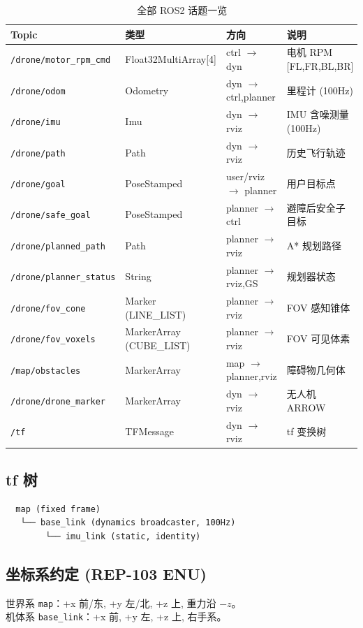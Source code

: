 \documentclass[12pt,a4paper]{article}
\newcommand{\ros}[1]{\texttt{#1}}
\begin{document}
\begin{table}[H]
\centering
\caption{全部 ROS2 话题一览}
\label{tab:topics}
\footnotesize
\begin{tabularx}{\textwidth}{l l l X}
\toprule
\textbf{Topic} & \textbf{类型} & \textbf{方向} & \textbf{说明} \\
\midrule
\ros{/drone/motor\_rpm\_cmd} & Float32MultiArray[4] & ctrl $\to$ dyn & 电机 RPM [FL,FR,BL,BR] \\
\ros{/drone/odom}        & Odometry     & dyn $\to$ ctrl,planner & 里程计 (100Hz) \\
\ros{/drone/imu}         & Imu          & dyn $\to$ rviz & IMU 含噪测量 (100Hz) \\
\ros{/drone/path}        & Path         & dyn $\to$ rviz & 历史飞行轨迹 \\
\ros{/drone/goal}        & PoseStamped & user/rviz $\to$ planner & 用户目标点 \\
\ros{/drone/safe\_goal}   & PoseStamped & planner $\to$ ctrl & 避障后安全子目标 \\
\ros{/drone/planned\_path} & Path        & planner $\to$ rviz & A* 规划路径 \\
\ros{/drone/planner\_status} & String    & planner $\to$ rviz,GS & 规划器状态 \\
\ros{/drone/fov\_cone}    & Marker (LINE\_LIST) & planner $\to$ rviz & FOV 感知锥体 \\
\ros{/drone/fov\_voxels}  & MarkerArray (CUBE\_LIST) & planner $\to$ rviz & FOV 可见体素 \\
\ros{/map/obstacles}     & MarkerArray & map $\to$ planner,rviz & 障碍物几何体 \\
\ros{/drone/drone\_marker} & MarkerArray & dyn $\to$ rviz & 无人机 ARROW \\
\ros{/tf}                & TFMessage   & dyn $\to$ rviz & tf 变换树 \\
\bottomrule
\end{tabularx}
\end{table}

\subsection{tf 树}
\begin{verbatim}
  map (fixed frame)
   └── base_link (dynamics broadcaster, 100Hz)
        └── imu_link (static, identity)
\end{verbatim}

\subsection{坐标系约定 (REP-103 ENU)}
世界系 \texttt{map}：+x 前/东, +y 左/北, +z 上, 重力沿 $-z$。\\
机体系 \texttt{base\_link}：+x 前, +y 左, +z 上, 右手系。
\end{document}
